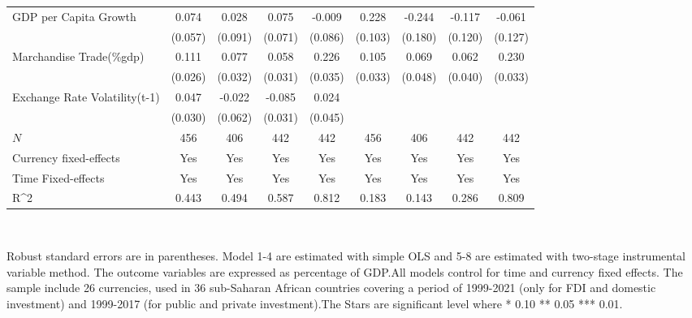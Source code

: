 \begin{table}[H]
\begin{adjustbox}{max width=\textwidth}
\begin{tabular}{l*{8}{c}}
\addlinespace
GDP per Capita Growth&       0.074         &       0.028         &       0.075         &      -0.009         &       0.228\sym{**} &      -0.244         &      -0.117         &      -0.061         \\
            &     (0.057)         &     (0.091)         &     (0.071)         &     (0.086)         &     (0.103)         &     (0.180)         &     (0.120)         &     (0.127)         \\
\addlinespace
Marchandise Trade(\%gdp)&       0.111\sym{***}&       0.077\sym{**} &       0.058\sym{*}  &       0.226\sym{***}&       0.105\sym{***}&       0.069         &       0.062         &       0.230\sym{***}\\
            &     (0.026)         &     (0.032)         &     (0.031)         &     (0.035)         &     (0.033)         &     (0.048)         &     (0.040)         &     (0.033)         \\
\addlinespace
Exchange Rate Volatility(t-1)&       0.047         &      -0.022         &      -0.085\sym{***}&       0.024         &                     &                     &                     &                     \\
            &     (0.030)         &     (0.062)         &     (0.031)         &     (0.045)         &                     &                     &                     &                     \\
\midrule
\(N\)       &         456         &         406         &         442         &         442         &         456         &         406         &         442         &         442         \\
Currency fixed-effects&         Yes         &         Yes         &         Yes         &         Yes         &         Yes         &         Yes         &         Yes         &         Yes         \\
Time Fixed-effects&         Yes         &         Yes         &         Yes         &         Yes         &         Yes         &         Yes         &         Yes         &         Yes         \\
R^{2}       &       0.443         &       0.494         &       0.587         &       0.812         &       0.183         &       0.143         &       0.286         &       0.809         \\
\bottomrule \end{tabular} \end{adjustbox} \\         \footnotesize \item Robust standard errors are in parentheses. Model 1-4 are estimated with simple OLS and 5-8 are estimated with two-stage instrumental variable method. The outcome variables are expressed as percentage of GDP.All models control for time and currency fixed effects. The sample include 26 currencies, used in 36 sub-Saharan African countries covering a period of 1999-2021 (only for FDI and domestic investment) and 1999-2017 (for public and private investment).The Stars are significant level where * 0.10 ** 0.05 *** 0.01. \end{table}
